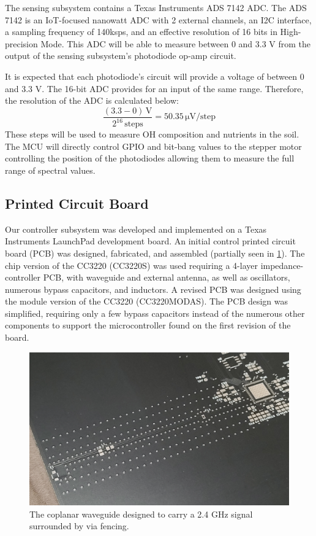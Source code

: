 \documentclass[journal]{IEEEtran}
\begin{document}
The sensing subsystem contains a Texas Instruments ADS 7142 ADC. The ADS 7142 is an IoT-focused nanowatt ADC with 2 external channels, an I2C interface, a sampling frequency of 140ksps, and an effective resolution of 16 bits in High-precision Mode. This ADC will be able to measure between 0 and 3.3 V from the output of the sensing subsystem's  photodiode op-amp circuit.

It is expected that each photodiode's circuit will provide a voltage of between 0 and 3.3 V. The 16-bit ADC provides for an input of the same range. Therefore, the resolution of the ADC is calculated below:
\begin{equation}
	\frac{(3.3 - 0)\,\mathrm{V}}{2^{16}\,\mathrm{steps}} =
	50.35\,\mathrm{\mu V}/\mathrm{step}
\end{equation}
These steps will be used to measure OH composition and nutrients in the soil. The MCU will directly control GPIO and bit-bang values to the stepper motor controlling the position of the photodiodes allowing them to measure the full range of spectral values.
\subsection{Printed Circuit Board} Our controller subsystem was developed and implemented on a Texas Instruments LaunchPad development board. An initial control printed circuit board (PCB) was designed, fabricated, and assembled (partially seen in \ref{fig:mcu_v1_cpwg}). The chip version of the CC3220 (CC3220S) was used requiring a 4-layer impedance-controller PCB, with waveguide and external antenna, as well as oscillators, numerous bypass capacitors, and inductors. A revised PCB was designed using the module version of the CC3220 (CC3220MODAS). The PCB design was simplified, requiring only a few bypass capacitors instead of the numerous other components to support the microcontroller found on the first revision of the board.

\begin{figure}[H]
	\centering
	\label{fig:mcu_v1_cpwg}
	\includegraphics[width=\linewidth]{images/mcu_v1_cpwg.jpg}
	\caption{The coplanar waveguide designed to carry a 2.4 GHz signal surrounded by via fencing.}
\end{figure}
\end{document}
